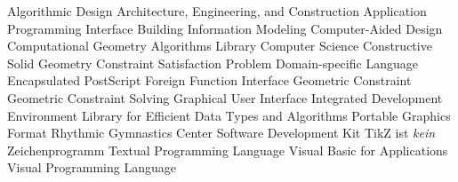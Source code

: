 \begin{acronym}[B-Rep]
     {Algorithmic Design}
    {Architecture, Engineering, and Construction}
    {Application Programming Interface}
    {Building Information Modeling}
    {Computer-Aided Design}
   {Computational Geometry Algorithms Library}
     {Computer Science}
    {Constructive Solid Geometry}
    {Constraint Satisfaction Problem}
    {Domain-specific Language}
    {Encapsulated PostScript}
    {Foreign Function Interface}
     {Geometric Constraint}
    {Geometric Constraint Solving}
    {Graphical User Interface}
    {Integrated Development Environment}
   {Library for Efficient Data Types and Algorithms}
    {Portable Graphics Format}
    {Rhythmic Gymnastics Center}
    {Software Development Kit}
   {TikZ ist \textit{kein} Zeichenprogramm}
    {Textual Programming Language}
    {Visual Basic for Applications}
    {Visual Programming Language}
\end{acronym}
